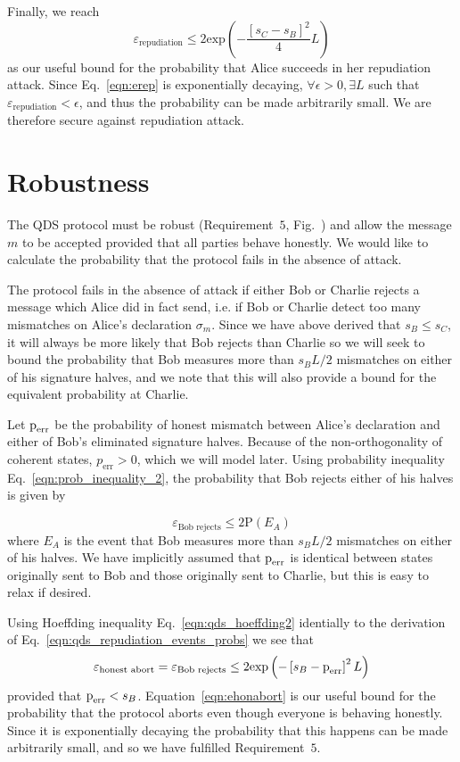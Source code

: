 Finally, we reach
\begin{equation}\label{eqn:erep}
\varepsilon_{\text{repudiation}} \le 2 \text{exp}\left( - \frac{\left[s_C - s_B\right]^2}{4} L\right)
\end{equation}
as our useful bound for the probability that Alice succeeds in her repudiation attack. Since Eq.~\ref{eqn:erep} is exponentially decaying, $\forall \epsilon > 0,  \exists L$ such that $\varepsilon_{\text{repudiation}} < \epsilon$, and thus the probability can be made arbitrarily small. We are therefore secure against repudiation attack.


\section{Robustness}
The QDS protocol must be robust (Requirement~$5$, Fig.~) and allow the message $m$ to be accepted provided that all parties behave honestly. We would like to calculate the probability that the protocol fails in the absence of attack.

The protocol fails in the absence of attack if either Bob or Charlie rejects a message which Alice did in fact send, i.e. if Bob or Charlie detect too many mismatches on Alice's declaration $\sigma_m$. Since we have above derived that $s_B \le s_C$, it will always be more likely that Bob rejects than Charlie so we will seek to bound the probability that Bob measures more than $s_B L/2$ mismatches on either of his signature halves, and we note that this will also provide a bound for the equivalent probability at Charlie.

Let $\text{p}_{\text{err}}$ be the probability of honest mismatch between Alice's declaration and either of Bob's eliminated signature halves. Because of the non-orthogonality of coherent states, $p_{\text{err}} > 0$, which we will model later. Using probability inequality Eq.~\ref{eqn:prob_inequality_2}, the probability that Bob rejects either of his halves is given by

\begin{equation}
\varepsilon_{\text{Bob rejects}} \le 2 \text{P}\left(E_A\right)
\end{equation}
where $E_A$ is the event that Bob measures more than $s_B L/2$ mismatches on either of his halves. We have implicitly assumed that $\text{p}_{\text{err}}$ is identical between states originally sent to Bob and those originally sent to Charlie, but this is easy to relax if desired.

Using Hoeffding inequality Eq.~\ref{eqn:qds_hoeffding2} identially to the derivation of Eq.~\ref{eqn:qds_repudiation_events_probs} we see that
\begin{equation}\label{eqn:ehonabort}
\varepsilon_{\text{honest abort}} = \varepsilon_{\text{Bob rejects}} \le 2 \text{exp}\left( - \left[s_B -\text{p}_{\text{err}}\right]^2 L\right)
\end{equation}
provided that $\text{p}_{\text{err}} < s_B$. Equation~\ref{eqn:ehonabort} is our useful bound for the probability that the protocol aborts even though everyone is behaving honestly. Since it is exponentially decaying the probability that this happens can be made arbitrarily small, and so we have fulfilled Requirement~$5$.

